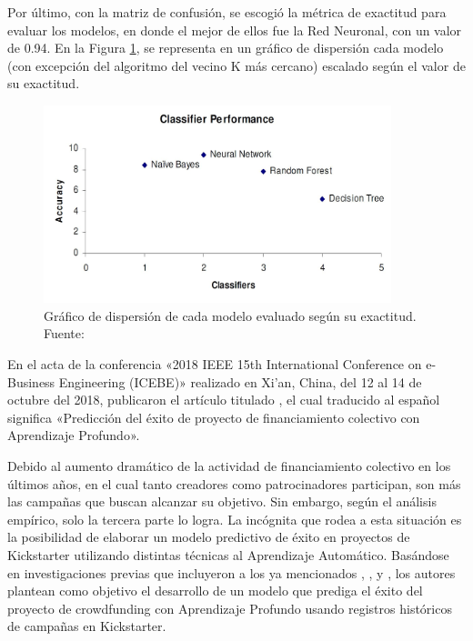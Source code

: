 Por último, con la matriz de confusión, se escogió la métrica de exactitud para evaluar los modelos, en donde el mejor de ellos fue la Red Neuronal, con un valor de 0.94. En la Figura \ref{2:fig121}, se representa en un gráfico de dispersión cada modelo (con excepción del algoritmo del vecino K más cercano) escalado según el valor de su exactitud.

\begin{figure}[!ht]
	\begin{center}
		\includegraphics[width=0.90\textwidth]{2/figures/kamath2018.jpg}
		\caption[Gráfico de dispersión de cada modelo evaluado según su exactitud]{Gráfico de dispersión de cada modelo evaluado según su exactitud.\\
			Fuente: \cite{pr_kamath2018suplearn}}
		\label{2:fig121}
	\end{center}
\end{figure}

En el acta de la conferencia «2018 IEEE 15th International Conference on e-Business Engineering (ICEBE)» realizado en Xi'an, China, del 12 al 14 de octubre del 2018, \cite{pr_yu2018deeplearning} publicaron el artículo titulado , el cual traducido al español significa «Predicción del éxito de proyecto de financiamiento colectivo con Aprendizaje Profundo».

Debido al aumento dramático de la actividad de financiamiento colectivo en los últimos años, en el cual tanto creadores como patrocinadores participan, son más las campañas que buscan alcanzar su objetivo. Sin embargo, según el análisis empírico, solo la tercera parte lo logra. La incógnita que rodea a esta situación es la posibilidad de elaborar un modelo predictivo de éxito en proyectos de Kickstarter utilizando distintas técnicas al Aprendizaje Automático. Basándose en investigaciones previas que incluyeron a los ya mencionados \cite{pr_chen2013kickpredict}, \cite{pr_li2016predcrowd}, \cite{pr_sawhney2016usingLT} y \cite{pr_kamath2018suplearn}, los autores plantean como objetivo el desarrollo de un modelo que prediga el éxito del proyecto de crowdfunding con Aprendizaje Profundo usando registros históricos de campañas en Kickstarter.


